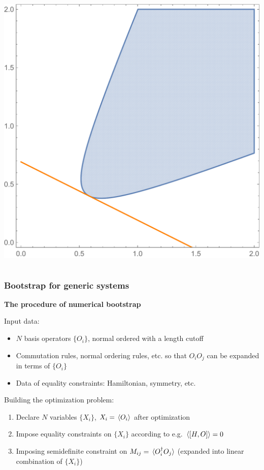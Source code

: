 \documentclass{beamer}
\begin{document}
\begin{frame}
\begin{columns}
\begin{column}{0.4\textwidth}
        \includegraphics[width=\textwidth]{jump-toy-2-benchmark-feasible-domain-and-result.pdf}
    \end{column}
\end{columns}

\end{frame}

\begin{frame}
\frametitle{Bootstrap for generic systems}

\textbf{The procedure of numerical bootstrap}   

Input data:
\begin{itemize}
    \item $N$ basis operators $\{O_i\}$, normal ordered with a length cutoff
    \item Commutation rules, normal ordering rules, etc. so that $O_i O_j$ can be expanded in terms of $\{O_i\}$
    \item Data of equality constraints: Hamiltonian, symmetry, etc.
\end{itemize}

Building the optimization problem:
\begin{enumerate}
    \item Declare $N$ variables $\{X_i\}$, $X_i = \expval*{O_i}$ after optimization
    \item Impose equality constraints on $\{X_i\}$ according to e.g. $\expval*{\comm{H}{O}} = 0$ 
    \item Imposing semidefinite constraint on $M_{ij} = \expval*{O_i^\dagger O_j}$ (expanded into linear combination of $\{X_i\}$)
\end{enumerate}

\end{frame}
\end{document}
